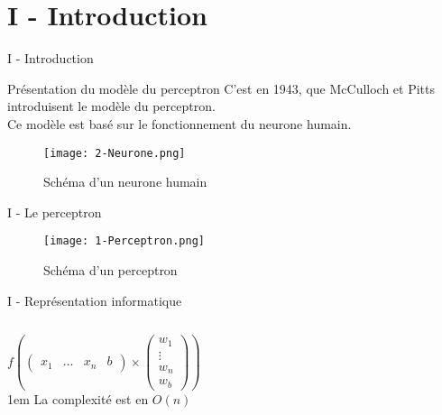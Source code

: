 
\section{I - Introduction}
\begin{frame}{I - Introduction}
	\begin{block}{Présentation du modèle du perceptron}
		C'est  en 1943, que McCulloch et Pitts introduisent le modèle du perceptron.  \\
		Ce modèle est basé sur le fonctionnement du neurone humain.
	\end{block}
	\begin{figure}
		\centering
		\texttt{[image: 2-Neurone.png]}
		\caption{Schéma d'un neurone humain}
	\end{figure}
\end{frame}


\begin{frame}{I - Le perceptron}
	\begin{figure}
		\centering
		\texttt{[image: 1-Perceptron.png]}
		\caption{Schéma d'un perceptron}
	\end{figure}
\end{frame}


\begin{frame}{I - Représentation informatique}
	\begin{columns}
		\begin{column}[]{0.4\textwidth}
			\begin{center}
				$
					f
					\left(
					\begin{pmatrix}
						x_1 & \ldots & x_n & b
					\end{pmatrix}
					\times
					\begin{pmatrix}
						w_1    \\
						\vdots \\
						w_n    \\
						w_b
					\end{pmatrix}
					\right)
				$ \\
				\openup 1em
				La complexité est en $O(n)$
			\end{center}
		\end{column}
		\begin{column}[]{0.5\textwidth}
			
		\end{column}
	\end{columns}
\end{frame}
